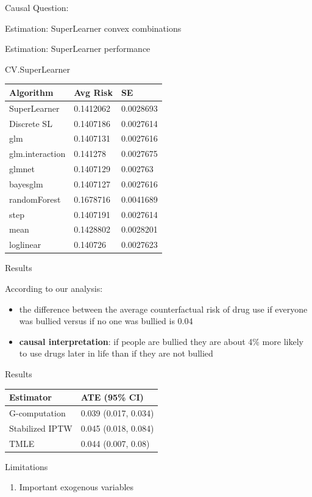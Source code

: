 \documentclass[ignorenonframetext,]{beamer}
\providecommand{\tightlist}{%
  \setlength{\itemsep}{0pt}\setlength{\parskip}{0pt}}
\begin{document}
\begin{frame}{Causal Question:}
\begin{block}{Estimation: SuperLearner convex combinations}
\end{block}

\begin{block}{Estimation: SuperLearner performance}

CV.SuperLearner

\begin{longtable}[]{@{}lll@{}}
\toprule
Algorithm & Avg Risk & SE\tabularnewline
\midrule
\endhead
SuperLearner & 0.1412062 & 0.0028693\tabularnewline
Discrete SL & 0.1407186 & 0.0027614\tabularnewline
glm & 0.1407131 & 0.0027616\tabularnewline
glm.interaction & 0.141278 & 0.0027675\tabularnewline
glmnet & 0.1407129 & 0.002763\tabularnewline
bayesglm & 0.1407127 & 0.0027616\tabularnewline
randomForest & 0.1678716 & 0.0041689\tabularnewline
step & 0.1407191 & 0.0027614\tabularnewline
mean & 0.1428802 & 0.0028201\tabularnewline
loglinear & 0.140726 & 0.0027623\tabularnewline
\bottomrule
\end{longtable}

\end{block}

\begin{block}{Results}

According to our analysis:

\begin{itemize}
\item
  the difference between the average counterfactual risk of drug use if
  everyone was bullied versus if no one was bullied is 0.04
\item
  \textbf{causal interpretation}: if people are bullied they are about
  4\% more likely to use drugs later in life than if they are not
  bullied
\end{itemize}

\end{block}

\begin{block}{Results}

\begin{longtable}[]{@{}ll@{}}
\toprule
Estimator & ATE (95\% CI)\tabularnewline
\midrule
\endhead
G-computation & 0.039 (0.017, 0.034)\tabularnewline
Stabilized IPTW & 0.045 (0.018, 0.084)\tabularnewline
TMLE & 0.044 (0.007, 0.08)\tabularnewline
\bottomrule
\end{longtable}

\end{block}

\begin{block}{Limitations}

\begin{enumerate}
\def\labelenumi{\arabic{enumi}.}
\tightlist
\item
  Important exogenous variables\\


\end{enumerate}
\end{block}
\end{frame}
\end{document}
